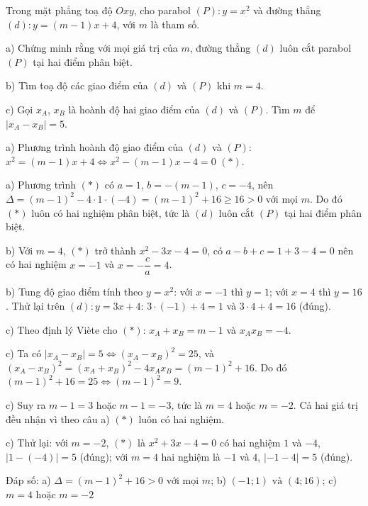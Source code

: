 \begin{problem}[9DS-PT2-048]
Trong mặt phẳng toạ độ $Oxy$, cho parabol $(P)\colon y = x^2$ và đường thẳng $(d)\colon y = (m - 1)x + 4$, với $m$ là tham số.

a) Chứng minh rằng với mọi giá trị của $m$, đường thẳng $(d)$ luôn cắt parabol $(P)$ tại hai điểm phân biệt.

b) Tìm toạ độ các giao điểm của $(d)$ và $(P)$ khi $m = 4$.

c) Gọi $x_A$, $x_B$ là hoành độ hai giao điểm của $(d)$ và $(P)$. Tìm $m$ để $|x_A - x_B| = 5$.

\begin{solution}
a) Phương trình hoành độ giao điểm của $(d)$ và $(P)$: $x^2 = (m - 1)x + 4 \Leftrightarrow x^2 - (m - 1)x - 4 = 0$ $(*)$.

a) Phương trình $(*)$ có $a = 1$, $b = -(m - 1)$, $c = -4$, nên $\Delta = (m - 1)^2 - 4 \cdot 1 \cdot (-4) = (m - 1)^2 + 16 \geq 16 > 0$ với mọi $m$. Do đó $(*)$ luôn có hai nghiệm phân biệt, tức là $(d)$ luôn cắt $(P)$ tại hai điểm phân biệt.

b) Với $m = 4$, $(*)$ trở thành $x^2 - 3x - 4 = 0$, có $a - b + c = 1 + 3 - 4 = 0$ nên có hai nghiệm $x = -1$ và $x = -\dfrac{c}{a} = 4$.

b) Tung độ giao điểm tính theo $y = x^2$: với $x = -1$ thì $y = 1$; với $x = 4$ thì $y = 16$. Thử lại trên $(d)\colon y = 3x + 4$: $3 \cdot (-1) + 4 = 1$ và $3 \cdot 4 + 4 = 16$ (đúng).

c) Theo định lý Viète cho $(*)$: $x_A + x_B = m - 1$ và $x_Ax_B = -4$.

c) Ta có $|x_A - x_B| = 5 \Leftrightarrow (x_A - x_B)^2 = 25$, và $(x_A - x_B)^2 = (x_A + x_B)^2 - 4x_Ax_B = (m - 1)^2 + 16$. Do đó $(m - 1)^2 + 16 = 25 \Leftrightarrow (m - 1)^2 = 9$.

c) Suy ra $m - 1 = 3$ hoặc $m - 1 = -3$, tức là $m = 4$ hoặc $m = -2$. Cả hai giá trị đều nhận vì theo câu a) $(*)$ luôn có hai nghiệm.

c) Thử lại: với $m = -2$, $(*)$ là $x^2 + 3x - 4 = 0$ có hai nghiệm $1$ và $-4$, $|1 - (-4)| = 5$ (đúng); với $m = 4$ hai nghiệm là $-1$ và $4$, $|-1 - 4| = 5$ (đúng).

Đáp số: a) $\boxed{\Delta = (m - 1)^2 + 16 > 0 \text{ với mọi } m}$; b) $\boxed{(-1; 1) \text{ và } (4; 16)}$; c) $\boxed{m = 4 \text{ hoặc } m = -2}$
\end{solution}
\end{problem}


